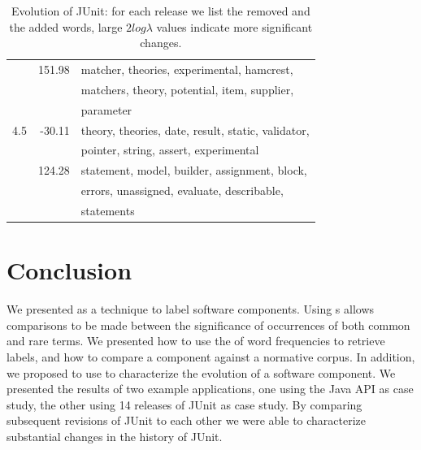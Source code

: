 \documentclass[10pt]{book}
\begin{document}
\begin{table}
{\begin{center}
\begin{tabular}{lrl}
~ & 151.98 & matcher, theories, experimental, hamcrest,\\~&~& matchers, theory, potential, item, supplier,\\~&~& parameter \\
\hline
4.5 & -30.11 & theory, theories, date, result, static, validator,\\~&~& pointer, string, assert, experimental \\
~ & 124.28 & statement, model, builder, assignment, block,\\~&~& errors, unassigned, evaluate, describable,\\~&~& statements \\
\end{tabular}
\end{center}}
\caption{Evolution of JUnit: for each release we list the removed and the added words, large $2log\lambda$ values indicate more significant changes.}
\label{tab:two}
\end{table}%





\section{Conclusion}\label{eventually}

We presented \loglr as a technique to label software components. Using \loglr{}s allows comparisons to be made between the significance of occurrences of both common and rare terms. We presented how to use the \loglr of word frequencies to retrieve labels, and how to compare a component against a normative corpus. In addition, we proposed to use \loglrs to characterize the evolution of a software component. We presented the results of two example applications, one using the Java API as case study, the other using 14 releases of JUnit as case study. By comparing subsequent revisions of JUnit to each other we were able to characterize substantial changes in the history of JUnit.
\end{document}
